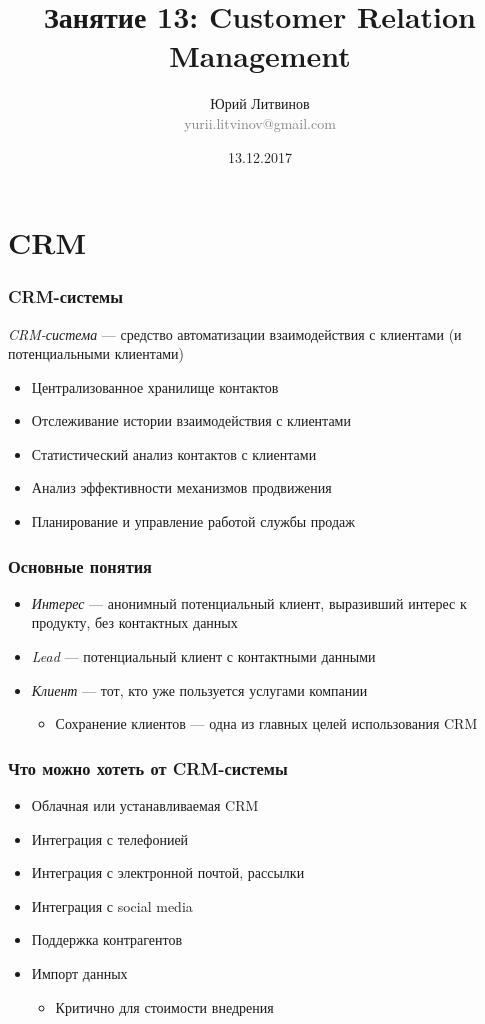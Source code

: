 \documentclass[xetex,mathserif,serif]{beamer}
\title{Занятие 13: Customer Relation Management}
\author[Юрий Литвинов]{Юрий Литвинов\\\small{\textcolor{gray}{yurii.litvinov@gmail.com}}}
\date{13.12.2017}
\begin{document}
	\frame{\titlepage}

	\section{CRM}

	\begin{frame}
		\frametitle{CRM-системы}
		\textit{CRM-система} --- средство автоматизации взаимодействия с клиентами (и потенциальными клиентами)
		\begin{itemize}
			\item Централизованное хранилище контактов
			\item Отслеживание истории взаимодействия с клиентами
			\item Статистический анализ контактов с клиентами
			\item Анализ эффективности механизмов продвижения
			\item Планирование и управление работой службы продаж
		\end{itemize}
	\end{frame}

	\begin{frame}
		\frametitle{Основные понятия}
		\begin{itemize}
			\item \textit{Интерес} --- анонимный потенциальный клиент, выразивший интерес к продукту, без контактных данных
			\item \textit{Lead} --- потенциальный клиент с контактными данными
			\item \textit{Клиент} --- тот, кто уже пользуется услугами компании
			\begin{itemize}
				\item Сохранение клиентов --- одна из главных целей использования CRM
			\end{itemize}
		\end{itemize}
	\end{frame}

	\begin{frame}
		\frametitle{Что можно хотеть от CRM-системы}
		\begin{itemize}
			\item Облачная или устанавливаемая CRM
			\item Интеграция с телефонией
			\item Интеграция с электронной почтой, рассылки
			\item Интеграция с social media
			\item Поддержка контрагентов
			\item Импорт данных
			\begin{itemize}
				\item Критично для стоимости внедрения
			\end{itemize}
		\end{itemize}
	\end{frame}
\end{document}
